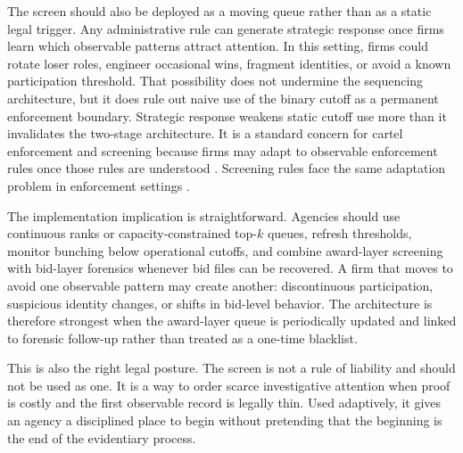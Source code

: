 The screen should also be deployed as a moving queue rather than
as a static legal trigger. Any administrative rule can
generate strategic response once firms learn which observable
patterns attract attention. In this setting, firms could rotate
loser roles, engineer occasional wins, fragment identities, or
avoid a known participation threshold. That possibility does not
undermine the sequencing architecture, but it does rule out naive
use of the binary cutoff as a permanent enforcement boundary.
Strategic response weakens static cutoff use more than it
invalidates the two-stage architecture. It is a standard concern
for cartel enforcement and screening because firms may adapt to
observable enforcement rules once those rules are understood
\citep{green1984noncooperative,haltiwanger1991the}. Screening
rules face the same adaptation problem in enforcement settings
\citep{harrington2008detecting,sanchezgraells2019screening}.

The implementation implication is straightforward. Agencies
should use continuous ranks or capacity-constrained top-$k$
queues, refresh thresholds, monitor bunching below operational
cutoffs, and combine award-layer screening with bid-layer
forensics whenever bid files can be recovered. A firm that moves
to avoid one observable pattern may create another: discontinuous
participation, suspicious identity changes, or shifts in
bid-level behavior. The architecture is therefore strongest when
the award-layer queue is periodically updated and linked to
forensic follow-up rather than treated as a one-time blacklist.

This is also the right legal posture. The screen is not a rule of
liability and should not be used as one. It is a way to order
scarce investigative attention when proof is costly and the first
observable record is legally thin. Used adaptively, it gives an
agency a disciplined place to begin without pretending that the
beginning is the end of the evidentiary process.
